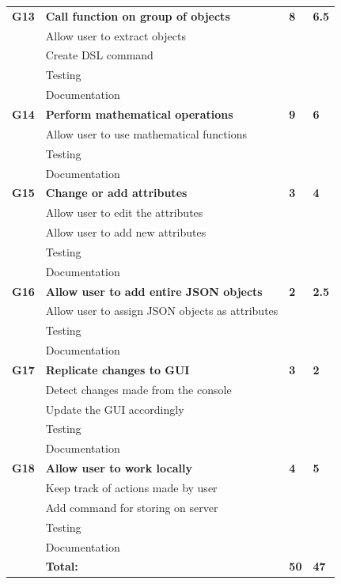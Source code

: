 \begin{table}
\begin{tabular}{ l p{8cm} l l }
 \bf{G13}	  &\bf{Call function on group of objects}		&\bf{8}		&\bf{6.5}		     \\
		  &Allow user to extract objects				&			&		\\
		  &Create DSL command						&			&		\\
		  &Testing								&			&		\\
		  &Documentation							&			&		\\

\bf{G14}	  &\bf{Perform mathematical operations}			&\bf{9}		&\bf{6}		     \\
		  &Allow user to use mathematical functions		&			&		\\
		  &Testing								&			&		\\
		  &Documentation							&			&		\\

\bf{G15}   	&\bf{Change or add attributes}				&\bf{3}		&\bf{4}		     \\ 
		  &Allow user to edit the attributes				&			&		\\
		  &Allow user to add new attributes				&			&		\\
		  &Testing								&			&		\\
		  &Documentation							&			&		\\

\bf{G16}   	&\bf{Allow user to add entire JSON objects}			&\bf{2}		&\bf{2.5}		     \\ 
		  &Allow user to assign JSON objects as attributes		&			&		\\
		  &Testing									&			&		\\
		  &Documentation								&			&		\\

\bf{G17}   	&\bf{Replicate changes to GUI}				&\bf{3}		&\bf{2}		     \\ 
		  &Detect changes made from the console		&			&		\\
		  &Update the GUI accordingly					&			&		\\
		  &Testing								&			&		\\
		  &Documentation							&			&		\\

\bf{G18}   	&\bf{Allow user to work locally}				&\bf{4}		&\bf{5}		     \\ 
		  &Keep track of actions made by user			&			&		\\
		  &Add command for storing on server			&			&		\\
		  &Testing								&			&		\\
		  &Documentation							&			&		\\

\hline 
		  &\bf{Total:}						&\bf{50}		&\bf{47}		\\
\hline
\end{tabular}
\label{table:sp3backlog}
\end{table}



